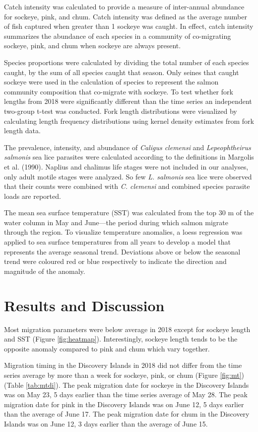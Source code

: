 \documentclass[fleqn,10pt]{wlpeerj} %
\begin{document}
Catch intensity was calculated to provide a measure of inter-annual
abundance for sockeye, pink, and chum. Catch intensity was defined as
the average number of fish captured when greater than 1 sockeye was
caught. In effect, catch intensity summarizes the abundance of each
species in a community of co-migrating sockeye, pink, and chum when
sockeye are always present.

Species proportions were calculated by dividing the total number of each
species caught, by the sum of all species caught that season. Only
seines that caught sockeye were used in the calculation of species to
represent the salmon community composition that co-migrate with sockeye.
To test whether fork lengths from 2018 were significantly different than
the time series an independent two-group t-test was conducted. Fork
length distributions were visualized by calculating length frequency
distributions using kernel density estimates from fork length data.

The prevalence, intensity, and abundance of \emph{Caligus clemensi} and
\emph{Lepeophtheirus salmonis} sea lice parasites were calculated
according to the definitions in Margolis et al. (1990). Naplius and
chalimus life stages were not included in our analyses, only adult
motile stages were analyzed. So few \emph{L. salmonis} sea lice were
observed that their counts were combined with \emph{C. clemensi} and
combined species parasite loads are reported.

The mean sea surface temperature (SST) was calculated from the top 30 m
of the water column in May and June---the period during which salmon
migrate through the region. To visualize temperature anomalies, a loess
regression was applied to sea surface temperatures from all years to
develop a model that represents the average seasonal trend. Deviations
above or below the seasonal trend were coloured red or blue respectively
to indicate the direction and magnitude of the anomaly.

\section{Results and Discussion}\label{results-and-discussion}

Most migration parameters were below average in 2018 except for sockeye
length and SST (Figure \ref{fig:heatmap}). Interestingly, sockeye length
tends to be the opposite anomaly compared to pink and chum which vary
together.

Migration timing in the Discovery Islands in 2018 did not differ from
the time series average by more than a week for sockeye, pink, or chum
(Figure \ref{fig:mt}) (Table \ref{tab:mtdi}). The peak migration date
for sockeye in the Discovery Islands was on May 23, 5 days earlier than
the time series average of May 28. The peak migration date for pink in
the Discovery Islands was on June 12, 5 days earlier than the average of
June 17. The peak migration date for chum in the Discovery Islands was
on June 12, 3 days earlier than the average of June 15.
\end{document}
